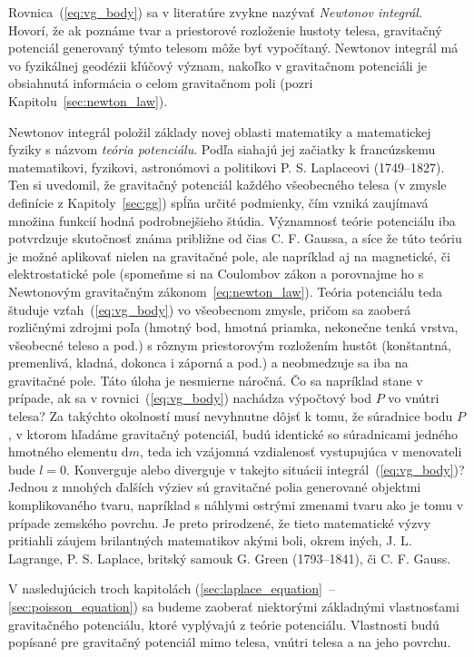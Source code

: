 \documentclass[a4paper, 12pt]{book}
\newcommand{\diff}{\mathrm d}
\begin{document}
Rovnica~(\ref{eq:vg_body}) sa v literatúre zvykne nazývať \emph{Newtonov 
integrál}.  Hovorí, že ak poznáme tvar a priestorové rozloženie hustoty telesa, 
gravitačný potenciál generovaný týmto telesom môže byť vypočítaný.  Newtonov 
integrál má vo fyzikálnej geodézii kľúčový význam, nakoľko v gravitačnom 
potenciáli je obsiahnutá informácia o celom gravitačnom poli (pozri 
Kapitolu~\ref{sec:newton_law}).

Newtonov integrál položil základy novej oblasti matematiky a matematickej 
fyziky s názvom \emph{teória potenciálu}.  Podľa \cite{MacMillan1930} siahajú 
jej začiatky k francúzskemu matematikovi, fyzikovi, astronómovi a politikovi 
P. S. Laplaceovi (1749--1827).  Ten si uvedomil, že gravitačný potenciál 
každého všeobecného telesa (v zmysle definície z Kapitoly~\ref{sec:gg}) spĺňa 
určité podmienky, čím vzniká zaujímavá množina funkcií hodná podrobnejšieho 
štúdia.  Významnosť teórie potenciálu iba potvrdzuje skutočnosť známa približne 
od čias C. F. Gaussa, a síce že túto teóriu je možné aplikovať nielen na 
gravitačné pole, ale  napríklad aj na magnetické, či elektrostatické pole 
(spomeňme si na Coulombov zákon a porovnajme ho s Newtonovým gravitačným 
zákonom~\ref{eq:newton_law}).  Teória potenciálu teda študuje 
vzťah~(\ref{eq:vg_body}) vo všeobecnom zmysle, pričom sa zaoberá rozličnými 
zdrojmi poľa (hmotný bod, hmotná priamka, nekonečne tenká vrstva, všeobecné 
teleso a pod.) s rôznym priestorovým rozložením hustôt (konštantná, premenlivá, 
kladná, dokonca i záporná a pod.) a neobmedzuje sa iba na gravitačné pole.  
Táto úloha je nesmierne náročná.  Čo sa napríklad stane v prípade, ak sa 
v rovnici~(\ref{eq:vg_body}) nachádza výpočtový bod $P$ vo vnútri telesa?  Za 
takýchto okolností musí nevyhnutne dôjsť k tomu, že súradnice bodu $P$, 
v ktorom hľadáme gravitačný potenciál, budú identické so súradnicami jedného 
hmotného elementu $\diff m$, teda ich vzájomná vzdialenosť vystupujúca 
v menovateli bude $l = 0$.  Konverguje alebo diverguje v takejto situácii 
integrál~(\ref{eq:vg_body})?  Jednou z mnohých ďalších výziev sú gravitačné 
polia generované objektmi komplikovaného tvaru, napríklad s náhlymi ostrými 
zmenami tvaru ako je tomu v prípade zemského povrchu.  Je preto prirodzené, že 
tieto matematické výzvy pritiahli záujem brilantných matematikov akými boli, 
okrem iných, J. L. Lagrange, P. S. Laplace, britský samouk G. Green 
(1793--1841), či C. F. Gauss.

V nasledujúcich troch kapitolách (\ref{sec:laplace_equation}~-- 
\ref{sec:poisson_equation}) sa budeme zaoberať niektorými základnými 
vlastnosťami gravitačného potenciálu, ktoré vyplývajú z teórie potenciálu.  
Vlastnosti budú popísané pre gravitačný potenciál mimo telesa, vnútri telesa 
a na jeho povrchu.
\end{document}
